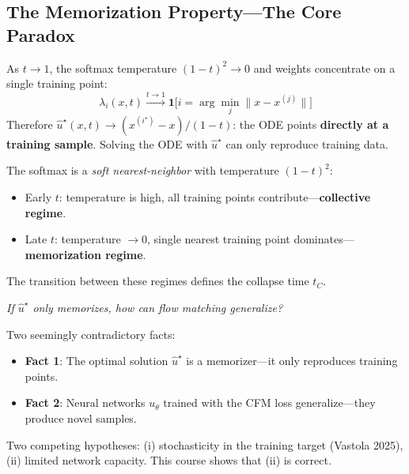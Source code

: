 \documentclass[11pt, a4paper]{article}
\theoremstyle{plain}
\theoremstyle{definition}
\theoremstyle{remark}
\begin{document}
\subsection{The Memorization Property---The Core Paradox}

\begin{keybox}
As $t \to 1$, the softmax temperature $(1-t)^2 \to 0$ and weights concentrate on a single training point:
\[
  \lambda_i(x, t) \xrightarrow{t\to 1} \mathbf{1}\bigl[i = \arg\min_j \|x - x^{(j)}\|\bigr]
\]
Therefore $\hat{u}^\star(x,t) \to (x^{(i^\star)} - x)/(1-t)$: the ODE points \textbf{directly at a training sample}. Solving the ODE with $\hat{u}^\star$ can only reproduce training data.
\end{keybox}

\begin{intubox}
The softmax is a \emph{soft nearest-neighbor} with temperature $(1-t)^2$:
\begin{itemize}
  \item Early $t$: temperature is high, all training points contribute---\textbf{collective regime}.
  \item Late $t$: temperature $\to 0$, single nearest training point dominates---\textbf{memorization regime}.
\end{itemize}
The transition between these regimes defines the collapse time $t_C$.
\end{intubox}

\begin{tcolorbox}[colback=lightred,colframe=mainred,arc=4pt,title={\textbf{The Central Paradox}},fonttitle=\bfseries\color{mainred}]
\begin{center}
\emph{If $\hat{u}^\star$ only memorizes, how can flow matching generalize?}
\end{center}
\vspace{6pt}
Two seemingly contradictory facts:
\begin{itemize}
  \item \textbf{Fact 1}: The optimal solution $\hat{u}^\star$ is a memorizer---it only reproduces training points.
  \item \textbf{Fact 2}: Neural networks $u_\theta$ trained with the CFM loss generalize---they produce novel samples.
\end{itemize}
Two competing hypotheses: (i) stochasticity in the training target (Vastola 2025), (ii) limited network capacity. This course shows that (ii) is correct.
\end{tcolorbox}
\end{document}

